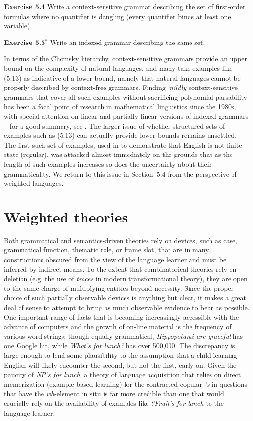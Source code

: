 \smallskip
\noindent
{\bf Exercise 5.4} 
Write a context-sensitive grammar describing the set of first-order formulas
where no quantifier is dangling (every quantifier binds at least one
variable). 

\smallskip
\noindent
{\bf Exercise 5.5$^*$} Write an indexed grammar describing the same set.

\smallskip 
\noindent 
In terms of the Chomsky hierarchy, context-sensitive grammars provide an upper
bound on the complexity of natural languages, and many take examples like
(5.13) as indicative of a lower bound, namely that natural languages cannot be
properly described by context-free grammars.  Finding {\it mildly}
context-sensitive grammars that cover all such examples without sacrificing
polynomial parsability has been a focal point of research in mathematical
linguistics since the 1980s, with special attention on linear and partially
linear versions of indexed grammars -- for a good summary, see
.  The larger issue of whether structured sets of
examples such as (5.13) can actually provide lower bounds remains
unsettled. The first such set of examples, used in  to
demonstrate that English is not finite state (regular), was attacked
almost immediately \cite{Yngve:1961} on the grounds that as the length of such
examples increases so does the uncertainty about their grammaticality. We
return to this issue in Section~5.4 from the perspective of weighted
languages.

\section{Weighted theories}

Both grammatical and semantics-driven theories rely on devices, such as case,
grammatical function, thematic role, or frame slot, that are in many
constructions obscured from the view of the language learner and must be
inferred by indirect means. To the extent that combinatorical theories rely on
deletion (e.g. the use of {\it traces} in modern transformational theory),
they are open to the same charge of multiplying entities beyond necessity.
 Since the proper choice of such partially observable devices is
anything but clear, it makes a great deal of sense to attempt to bring as much
observable evidence to bear as possible. One important range of facts that is
becoming increasingly accessible with the advance of computers and the growth
of on-line material is the frequency of various word strings: though equally
grammatical, {\it Hippopotami are graceful} has one Google hit, while {\it
  What's for lunch?} has over 500,000. The discrepancy is large enough to lend
some plausibility to the assumption that a child learning English will likely
encounter the second, but not the first, early on.  Given the paucity of {\it
  NP's for lunch}, a theory of language acquisition that relies on direct
memorization (example-based learning) for the contracted copular {\it 's} in
questions that have the {\it wh}-element in situ is far more credible than one
that would crucially rely on the availability of examples like {\it ?Fruit's
  for lunch} to the language learner.

